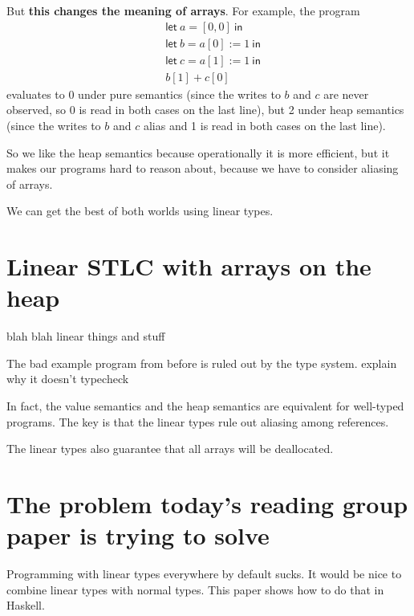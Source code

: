 \documentclass{article}
\newcommand{\todo}[1]{{\color{red} #1}}
\newcommand{\kw}[1]{\ensuremath{\mathsf{#1}}}
\newcommand{\letin}[2]{\kw{let}\ #1 = #2\ \kw{in}}
\begin{document}
But \textbf{this changes the meaning of arrays}. For example, the program
\begin{align*}
  &\letin{a}{[0, 0]}\\
  &\letin{b}{a[0] := 1}\\
  &\letin{c}{a[1] := 1}\\
  &b[1] + c[0]
\end{align*}
evaluates to 0 under pure semantics (since the writes to $b$ and $c$
are never observed, so 0 is read in both cases on the last line), but
2 under heap semantics (since the writes to $b$ and $c$ alias and 1 is
read in both cases on the last line).

So we like the heap semantics because operationally it is more
efficient, but it makes our programs hard to reason about, because we
have to consider aliasing of arrays.

We can get the best of both worlds using linear types.

\section*{Linear STLC with arrays on the heap}

\vspace{1cm}
\todo{blah blah linear things and stuff}
\vspace{1cm}

The bad example program from before is ruled out by the type
system. \todo{explain why it doesn't typecheck}

In fact, the value semantics and the heap semantics are equivalent for
well-typed programs. The key is that the linear types rule out
aliasing among references.

The linear types also guarantee that all arrays will be deallocated.

\section*{The problem today's reading group paper is trying to solve}

Programming with linear types everywhere by default sucks. It would be nice
to combine linear types with normal types. This paper shows how to do that
in Haskell.
\end{document}
